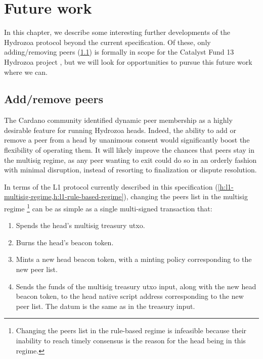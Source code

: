 \documentclass[../hydrozoa.tex]{subfiles}
\begin{document}
\setcounter{footnote}{0}%
\chapter{Future work}%
\label{h:future-work}%

In this chapter, we describe some interesting further developments of the Hydrozoa protocol beyond the current specification.
Of these, only adding/removing peers (\cref{h:future-work-add-remove-members}) is formally in scope for the Catalyst Fund 13 Hydrozoa project \citep{FlerovskyCatalystMilestonesHydrozoa2024}, but we will look for opportunities to pursue this future work where we can.

\section{Add/remove peers}%
\label{h:future-work-add-remove-members}%

The Cardano community identified dynamic peer membership as a highly desirable feature for running Hydrozoa heads.
Indeed, the ability to add or remove a peer from a head by unanimous consent would significantly boost the flexibility of operating them.
It will likely improve the chances that peers stay in the multisig regime, as any peer wanting to exit could do so in an orderly fashion with minimal disruption, instead of resorting to finalization or dispute resolution.

In terms of the L1 protocol currently described in this specification (\cref{h:l1-multisig-regime,h:l1-rule-based-regime}), changing the peers list in the multisig regime%
  \footnote{Changing the peers list in the rule-based regime is infeasible because their inability to reach timely consensus is the reason for the head being in this regime.}
  can be as simple as a single multi-signed transaction that:
\begin{enumerate}
  \item Spends the head's multisig treasury utxo.  
  \item Burns the head's beacon token.
  \item Mints a new head beacon token, with a minting policy corresponding to the new peer list.
  \item Sends the funds of the multisig treasury utxo input, along with the new head beacon token, to the head native script address corresponding to the new peer list.
    The datum is the same as in the treasury input.
\end{enumerate}
\end{document}
